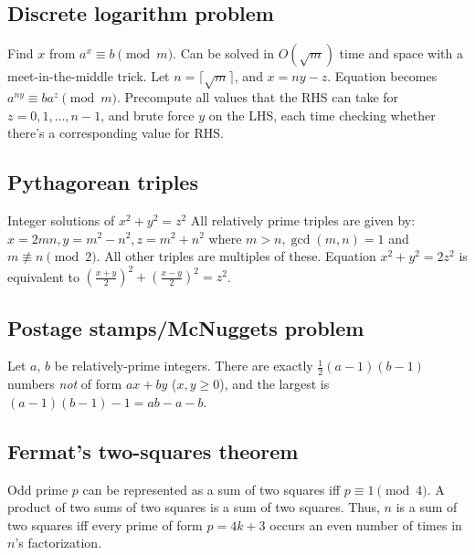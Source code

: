 \documentclass[12pt]{extarticle}
\begin{document}
\begin{multicols*}{2}


\subsection{Discrete logarithm problem}  Find $x$ from $a^x \equiv b \pmod{m}$.
Can be solved in $O(\sqrt{m})$ time and space with a meet-in-the-middle trick.
Let $n = \lceil \sqrt{m} \rceil$, and $x = ny - z$.
Equation becomes $a^{ny} \equiv b a^z \pmod{m}$.  Precompute all values that
the RHS can take for $z = 0, 1, \dots, n-1$, and brute force $y$ on the LHS,
each time checking whether there's a corresponding value for RHS.


\subsection{Pythagorean triples}  Integer solutions of $x^2 + y^2 = z^2$
All relatively prime triples are given by:
$x=2mn, y=m^2-n^2, z=m^2+n^2$ where $m>n, \gcd(m,n)=1$ and $m \not\equiv n \pmod{2}$.
All other triples are multiples of these.
Equation $x^2 + y^2 = 2z^2$ is equivalent to $(\frac{x+y}{2})^2 + (\frac{x-y}{2})^2 = z^2$.

\subsection{Postage stamps/McNuggets problem}  Let $a$, $b$ be relatively-prime integers.
There are exactly $\frac{1}{2}(a-1)(b-1)$ numbers \emph{not} of form $ax+by$ ($x,y \ge 0$),
and the largest is $(a-1)(b-1)-1 = ab - a - b$.

\subsection{Fermat's two-squares theorem}  Odd prime $p$ can be represented
as a sum of two squares iff $p \equiv 1 {\pmod 4}$.
A product of two sums of two squares is a sum of two squares.
Thus, $n$ is a sum of two squares iff every prime of
form $p=4k+3$ occurs an even number of times in $n$'s factorization.





\end{multicols*}
\end{document}
